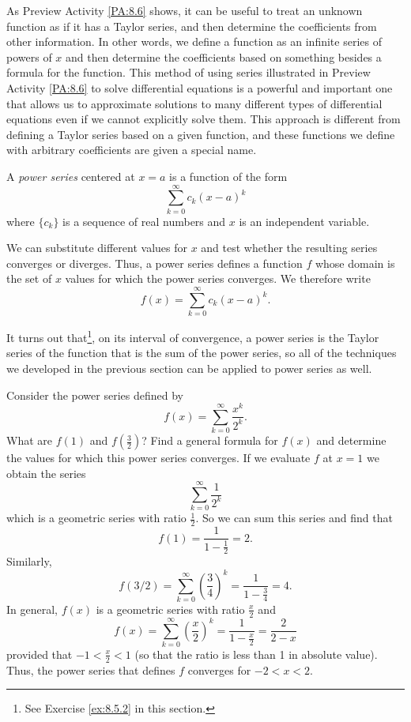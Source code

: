 As Preview Activity \ref{PA:8.6} shows, it can be useful to treat an unknown function as if it has a Taylor series, and then determine the coefficients from other information. In other words, we define a function as an infinite series of powers of $x$ and then determine the coefficients based on something besides a formula for the function. This method of using series illustrated in Preview Activity \ref{PA:8.6} to solve differential equations is a powerful and important one that allows us to  approximate solutions to many different types of differential equations even if we cannot explicitly solve them.  This approach is different from defining a Taylor series based on a given function, and these functions we define with arbitrary coefficients are given a special name.

\begin{definition} A \emph{power series} centered at $x = a$ is a function of the form
\begin{equation} \label{eq:8.6_power_series}
\sum_{k=0}^{\infty} c_k(x-a)^k
\end{equation}
where $\{c_k\}$ is a sequence of real numbers and $x$ is an independent variable.
\end{definition}
We can substitute different values for $x$ and test whether the resulting series converges or diverges. Thus, a power series defines a function $f$ whose domain is the set of $x$ values for which the power series converges.  We therefore write
\[f(x) = \sum_{k=0}^{\infty} c_k(x-a)^k.\]

It turns out that\footnote{See Exercise \ref{ex:8.5.2} in this section.}, on its interval of convergence, a power series is the Taylor series of the function that is the sum of the power series, so all of the techniques we developed in the previous section can be applied to power series as well.

\bex \label{Ex:8.6.1}
Consider the power series defined by
\[f(x) = \sum_{k=0}^{\infty} \frac{x^k}{2^k}.\]
What are $f(1)$ and $f\left(\frac{3}{2}\right)$? Find a general formula for $f(x)$ and determine the values for which this power series converges.
\eex
If we evaluate $f$ at $x=1$ we obtain the series
\[\sum_{k=0}^{\infty} \frac{1}{2^k}\]
which is a geometric series with ratio $\frac{1}{2}$. So we can sum this series and find that
\[f(1) = \frac{1}{1-\frac{1}{2}} = 2.\]
 Similarly,
\[f(3/2) = \sum_{k=0}^{\infty} \left(\frac{3}{4}\right)^k = \frac{1}{1-\frac{3}{4}} = 4.\]
In general, $f(x)$ is a geometric series with ratio $\frac{x}{2}$ and
\[f(x) = \sum_{k=0}^{\infty} \left(\frac{x}{2}\right)^k = \frac{1}{1-\frac{x}{2}} = \frac{2}{2-x}\]
provided that $-1 < \frac{x}{2} < 1$ (so that the ratio is less than 1 in absolute value). Thus, the power series that defines $f$ converges for $-2 < x < 2$.
\afterex

